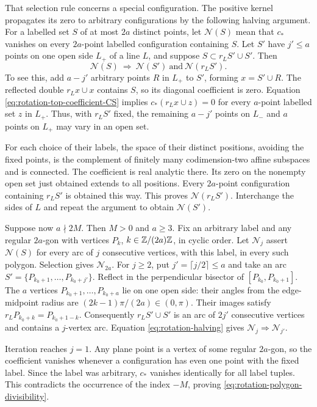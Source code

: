 That selection rule concerns a special configuration. The
positive kernel propagates its zero to arbitrary configurations
by the following halving argument. For a labelled set $S$ of
at most $2a$ distinct points, let $\mathcal N(S)$ mean that
$c_*$ vanishes on every $2a$-point labelled configuration
containing $S$.
Let $S'$ have $j'\le a$ points on one open side $L_+$ of a line
$L$, and suppose $S\subset r_LS'\cup S'$.
Then
\begin{equation}\label{eq:rotation-halving}
 \mathcal N(S)\ \Longrightarrow\
       \mathcal N(S')\ \text{and}\ \mathcal N(r_LS').
\end{equation}
To see this, add $a-j'$ arbitrary points $R$ in $L_+$ to $S'$,
forming $x=S'\cup R$. The reflected double $r_Lx\cup x$
contains $S$, so its diagonal coefficient is zero.
Equation \eqref{eq:rotation-top-coefficient-CS} implies
$c_*(r_Lx\cup z)=0$ for every $a$-point labelled set $z$ in $L_+$.
Thus, with $r_LS'$ fixed, the remaining $a-j'$ points on
$L_-$ and $a$ points on $L_+$ may vary in an open set.

For each choice of their labels, the space of their distinct
positions, avoiding the fixed points, is the complement of
finitely many codimension-two affine subspaces and is connected.
The coefficient is real analytic there. Its zero on the
nonempty open set just obtained extends to all positions.
Every $2a$-point configuration containing $r_LS'$ is obtained
this way. This proves $\mathcal N(r_LS')$.
Interchange the sides of $L$ and repeat the argument to obtain
$\mathcal N(S')$.

Suppose now $a\nmid2M$. Then $M>0$ and $a\ge3$.
Fix an arbitrary label and any regular $2a$-gon with vertices
$P_k$, $k\in\mathbb Z/(2a)\mathbb Z$, in cyclic order.
Let $\mathcal N_j$ assert $\mathcal N(S)$ for every arc of $j$
consecutive vertices, with this label, in every such polygon.
Selection gives $\mathcal N_{2a}$.
For $j\ge2$, put $j'=\lceil j/2\rceil\le a$ and take an arc
$S'=\{P_{k_0+1},\ldots,P_{k_0+j'}\}$.
Reflect in the perpendicular bisector of
$[P_{k_0},P_{k_0+1}]$.
The $a$ vertices $P_{k_0+1},\ldots,P_{k_0+a}$ lie on one
open side: their angles from the edge-midpoint radius are
$(2k-1)\pi/(2a)\in(0,\pi)$.
Their images satisfy $r_LP_{k_0+k}=P_{k_0+1-k}$.
Consequently $r_LS'\cup S'$ is an arc of $2j'$ consecutive
vertices and contains a $j$-vertex arc.
Equation \eqref{eq:rotation-halving} gives
$\mathcal N_j\Rightarrow\mathcal N_{j'}$.

Iteration reaches $j=1$. Any plane point is a vertex of some
regular $2a$-gon, so the coefficient vanishes whenever a
configuration has even one point with the fixed label.
Since the label was arbitrary, $c_*$ vanishes identically for
all label tuples. This contradicts the occurrence of the
index $-M$, proving \eqref{eq:rotation-polygon-divisibility}.

